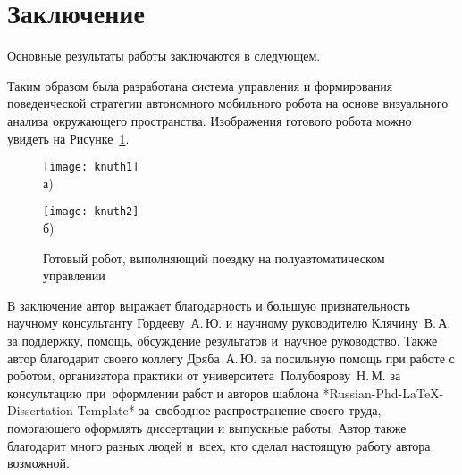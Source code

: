 \chapter*{Заключение}                       %


Основные результаты работы заключаются в следующем.

Таким образом была разработана система управления и формирования поведенческой стратегии автономного мобильного робота на основе визуального анализа окружающего пространства. Изображения готового робота можно увидеть на Рисунке~\cref{fig:done}.

\begin{figure}[ht]
    \begin{minipage}[b][][b]{0.49\linewidth}\centering
        \texttt{[image: knuth1]} \\ а)
    \end{minipage}
    \hfill
    \begin{minipage}[b][][b]{0.49\linewidth}\centering
        \texttt{[image: knuth2]} \\ б)
    \end{minipage}
    \caption{Готовый робот, выполняющий поездку на полуавтоматическом управлении}
    \label{fig:done}
\end{figure}

В заключение автор
выражает благодарность и большую признательность научному консультанту
Гордееву~А.\,Ю. и научному руководителю Клячину~В.\,А. за поддержку, помощь, обсуждение результатов и~научное
руководство. Также автор благодарит своего коллегу Дряба~А.\,Ю. за посильную помощь при работе с роботом, организатора практики от университета~Полубоярову~Н.\,М.
за консультацию при~оформлении работ и авторов шаблона
*Russian-Phd-LaTeX-Dissertation-Template* за~свободное распространение своего труда, 
помогающего оформлять диссертации и выпускные работы. Автор также благодарит много разных людей
и~всех, кто сделал настоящую работу автора возможной.
